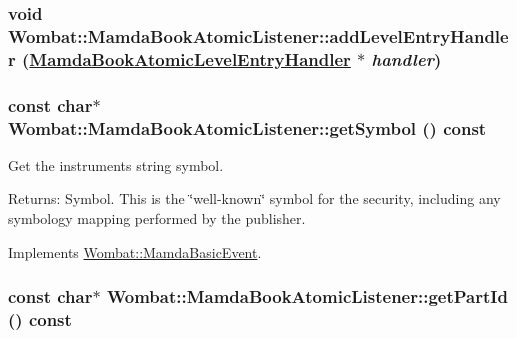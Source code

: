 \hypertarget{classWombat_1_1MamdaBookAtomicListener_749db39c3d4f92bc109377a20ed0a631}{
\subsubsection[addLevelEntryHandler]{\setlength{\rightskip}{0pt plus 5cm}void Wombat::Mamda\-Book\-Atomic\-Listener::add\-Level\-Entry\-Handler (\hyperlink{classWombat_1_1MamdaBookAtomicLevelEntryHandler}{Mamda\-Book\-Atomic\-Level\-Entry\-Handler} $\ast$ {\em handler})}}
\label{classWombat_1_1MamdaBookAtomicListener_749db39c3d4f92bc109377a20ed0a631}


\hypertarget{classWombat_1_1MamdaBookAtomicListener_70cfa31bc3d1010dc24c768525dbd62c}{
\subsubsection[getSymbol]{\setlength{\rightskip}{0pt plus 5cm}const char$\ast$ Wombat::Mamda\-Book\-Atomic\-Listener::get\-Symbol () const}}
\label{classWombat_1_1MamdaBookAtomicListener_70cfa31bc3d1010dc24c768525dbd62c}


Get the instruments string symbol. 

\begin{Desc}
\item[Returns:]Symbol. This is the \char`\"{}well-known\char`\"{} symbol for the security, including any symbology mapping performed by the publisher. \end{Desc}


Implements \hyperlink{classWombat_1_1MamdaBasicEvent_8783b136a1305d21c578ced8618c090b}{Wombat::Mamda\-Basic\-Event}.\hypertarget{classWombat_1_1MamdaBookAtomicListener_b976bfe1cf039410ca1c586214d6f2f2}{
\subsubsection[getPartId]{\setlength{\rightskip}{0pt plus 5cm}const char$\ast$ Wombat::Mamda\-Book\-Atomic\-Listener::get\-Part\-Id () const}}
\label{classWombat_1_1MamdaBookAtomicListener_b976bfe1cf039410ca1c586214d6f2f2}


